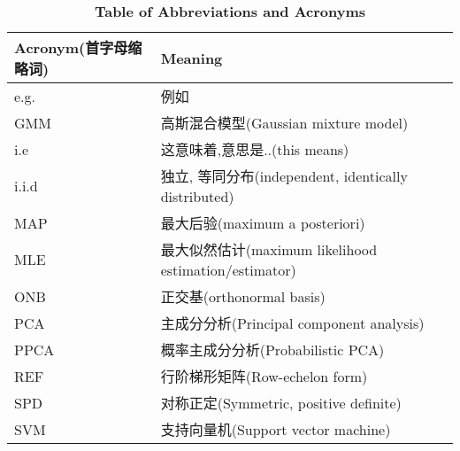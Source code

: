 \begin{table}
\caption*{\textbf{Table of Abbreviations and Acronyms}}
\begin{tabular}{llp{\textwidth}}
	\hline
	Acronym(首字母缩略词) & Meaning \\
	\hline
	\hline
	e.g. & 例如 \\
	GMM & 高斯混合模型(Gaussian mixture model) \\
	i.e & 这意味着,意思是..(this means)\\
	i.i.d & 独立, 等同分布(independent, identically distributed) \\
	MAP & 最大后验(maximum a posteriori) \\
	MLE & 最大似然估计(maximum likelihood estimation/estimator) \\
	ONB & 正交基(orthonormal basis) \\
	PCA & 主成分分析(Principal component analysis) \\
	PPCA & 概率主成分分析(Probabilistic PCA) \\
	REF & 行阶梯形矩阵(Row-echelon form) \\
	SPD & 对称正定(Symmetric, positive definite) \\
	SVM & 支持向量机(Support vector machine) \\
	\hline
\end{tabular}
\end{table}

